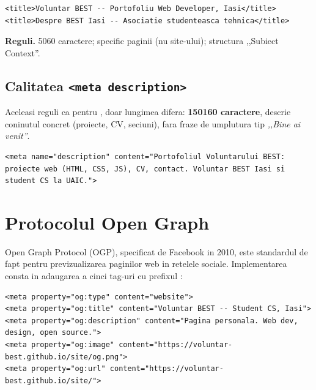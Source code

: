 \begin{dado}[Asa da]
\begin{lstlisting}[style=html, numbers=none]
<title>Voluntar BEST -- Portofoliu Web Developer, Iasi</title>
<title>Despre BEST Iasi -- Asociatie studenteasca tehnica</title>
\end{lstlisting}
\textbf{Reguli.} 50\textendash{}60 caractere; specific paginii (nu site-ului); structura ,,Subiect \textendash{} Context''.
\end{dado}

\subsection{Calitatea \texttt{<meta description>}}

Aceleasi reguli ca pentru , doar lungimea difera: \textbf{150\textendash{}160 caractere}, descrie coninutul concret (proiecte, CV, seciuni), fara fraze de umplutura tip \emph{,,Bine ai venit''}.

\begin{lstlisting}[style=html, numbers=none]
<meta name="description" content="Portofoliul Voluntarului BEST: proiecte web (HTML, CSS, JS), CV, contact. Voluntar BEST Iasi si student CS la UAIC.">
\end{lstlisting}

\section{Protocolul Open Graph}

Open Graph Protocol (OGP), specificat de Facebook in 2010, este standardul de fapt pentru previzualizarea paginilor web in retelele sociale. Implementarea consta in adaugarea a cinci tag-uri  cu prefixul :

\begin{lstlisting}[style=html, caption={Tag-uri OGP minimale}]
<meta property="og:type" content="website">
<meta property="og:title" content="Voluntar BEST -- Student CS, Iasi">
<meta property="og:description" content="Pagina personala. Web dev, design, open source.">
<meta property="og:image" content="https://voluntar-best.github.io/site/og.png">
<meta property="og:url" content="https://voluntar-best.github.io/site/">
\end{lstlisting}

